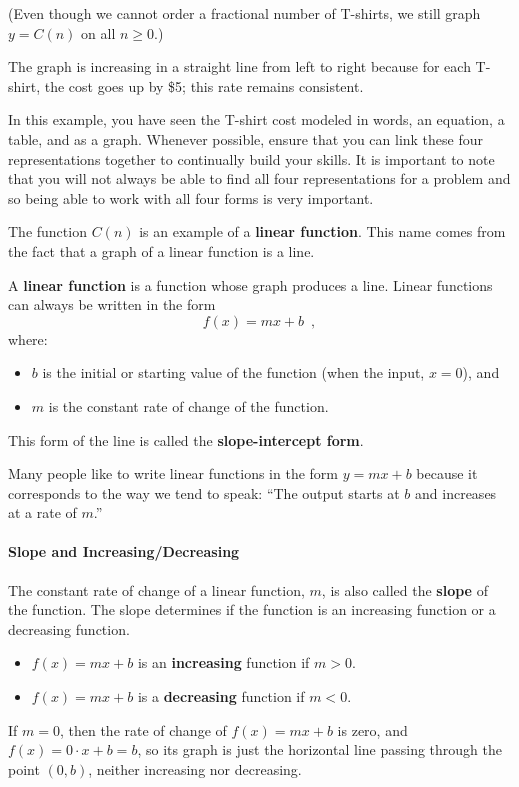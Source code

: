  (Even though we cannot order a fractional number of T-shirts, we still graph $y=C(n)$ on all $n\ge 0$.)

The graph is increasing in a straight line from left to right because for each T-shirt, the cost goes up by \$5; this rate remains consistent.

In this example, you have seen the T-shirt cost modeled in words, an equation, a table, and as a graph. Whenever possible, ensure that you can link these four representations together to continually build your skills. It is important to note that you will not always be able to find all four representations for a problem and so being able to work with all four forms is very important.

The function $C(n)$ is an example of a {\bf linear function}. This name comes from the fact that a graph of a linear function is a line.


\begin{definition}
A \textbf{linear function} is a function whose graph produces a line. Linear functions can always be written in the form
$$f(x) = mx +b \enspace ,$$
where:
    \begin{itemize}
        \item $b$ is the initial or starting value of the function (when the input, $x = 0$), and
        \item $m$ is the constant rate of change of the function.
    \end{itemize}
This form of the line is called the {\bf slope-intercept form}.
\end{definition}

Many people like to write linear functions in the form $y=mx + b$ because it corresponds to the way we tend to speak: ``The output starts at $b$ and increases at a rate of $m$.''

\paragraph*{Slope and Increasing/Decreasing}

The constant rate of change of a linear function, $m$, is also called the \textbf{slope} of the function. The slope determines if the function is an increasing function or a decreasing function.
\begin{itemize}
  \item $f(x) = mx + b$ is an \textbf{increasing} function if $m>0$.
  \item $f(x) = mx + b$ is a \textbf{decreasing} function if $m<0$.
\end{itemize}
If $m=0$, then the rate of change of $f(x) = mx+b$ is zero, and $f(x) = 0\cdot x+b = b$, so its graph is just the horizontal line passing through the point $(0, b)$, neither increasing nor decreasing.

